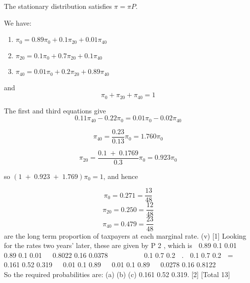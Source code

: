 \documentclass[a4paper,12pt]{article}
\begin{document}
The stationary distribution satisfies $\pi = \pi P.$

We have:
  
\begin{enumerate}
\item ${ \displaystyle \pi_{0} = 0.89\pi_{0} + 0.1\pi_{20} + 0.01\pi_{40}  }$
\item ${ \displaystyle \pi_{20} = 0.1\pi_{0} +  0.7\pi_{20} + 0.1\pi_{40}  }$
\item ${ \displaystyle \pi_{40} = 0.01\pi_{0} + 0.2\pi_{20} + 0.89\pi_{40}  }$
\end{enumerate}

and
\[ \pi_{0} + \pi_{20} + \pi_{40} = 1 \]

The first and third equations give
\[ 0.11 \pi_{40} - 0.22 \pi_{0} = 0.01 \pi_{0} - 0.02 \pi_{40} \]

\[ \pi_{40} = \frac{0.23}{0.13} \pi_{0} = 1.760 \pi_{0} \]

\[ \pi_{20} = \frac{0.1 \; + \; 0.1769}{0.3} \pi_{0} = 0.923 \pi_{0} \]

so $(1 \;+\; 0.923 \;+\;1.769)\pi_0 =1$, and hence 

\[ \pi_{0} = 0.271 = \frac{13}{48} \]
\[ \pi_{20} = 0.250 = \frac{12}{48} \]
\[ \pi_{40} = 0.479 = \frac{23}{48} \]
are the long term proportion of taxpayers at each marginal rate.
(v)
[1]
Looking for the rates two years’ later, these are given by P 2 , which is
 0.89 0.1 0.01   0.89 0.1 0.01   0.8022 0.16 0.0378 

 
 

 0.1 0.7 0.2  .  0.1 0.7 0.2  =  0.161 0.52 0.319 
 0.01 0.1 0.89   0.01 0.1 0.89   0.0278 0.16 0.8122 

 
 

So the required probabilities are:
(a)
(b)
(c)
0.161
0.52
0.319.
[2]
[Total 13]

\end{document}
